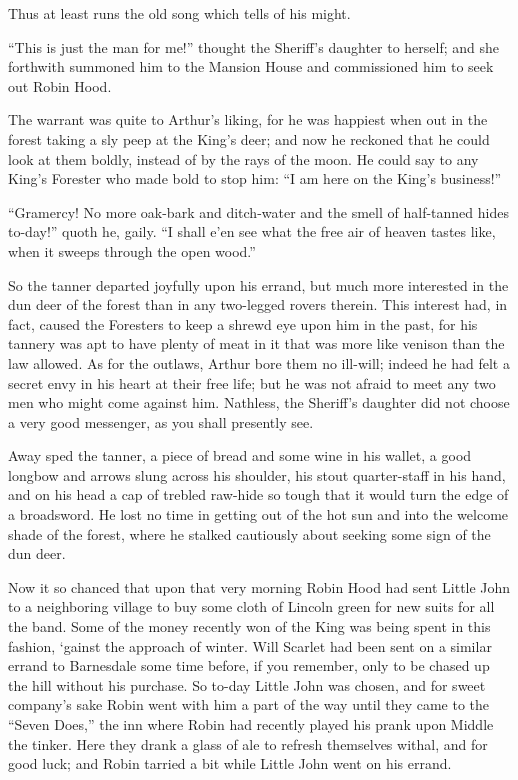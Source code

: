 Thus at least runs the old song which tells of his might.

``This is just the man for me!'' thought the Sheriff's daughter to
herself; and she forthwith summoned him to the Mansion House and
commissioned him to seek out Robin Hood.

The warrant was quite to Arthur's liking, for he was happiest when out
in the forest taking a sly peep at the King's deer; and now he reckoned
that he could look at them boldly, instead of by the rays of the moon.
He could say to any King's Forester who made bold to stop him: ``I am
here on the King's business!''

``Gramercy! No more oak-bark and ditch-water and the smell of
half-tanned hides to-day!'' quoth he, gaily. ``I shall e'en see what the
free air of heaven tastes like, when it sweeps through the open wood.''

So the tanner departed joyfully upon his errand, but much more
interested in the dun deer of the forest than in any two-legged rovers
therein. This interest had, in fact, caused the Foresters to keep a
shrewd eye upon him in the past, for his tannery was apt to have plenty
of meat in it that was more like venison than the law allowed. As for
the outlaws, Arthur bore them no ill-will; indeed he had felt a secret
envy in his heart at their free life; but he was not afraid to meet any
two men who might come against him. Nathless, the Sheriff's daughter did
not choose a very good messenger, as you shall presently see.

Away sped the tanner, a piece of bread and some wine in his wallet, a
good longbow and arrows slung across his shoulder, his stout
quarter-staff in his hand, and on his head a cap of trebled raw-hide so
tough that it would turn the edge of a broadsword. He lost no time in
getting out of the hot sun and into the welcome shade of the forest,
where he stalked cautiously about seeking some sign of the dun deer.

Now it so chanced that upon that very morning Robin Hood had sent Little
John to a neighboring village to buy some cloth of Lincoln green for new
suits for all the band. Some of the money recently won of the King was
being spent in this fashion, `gainst the approach of winter. Will
Scarlet had been sent on a similar errand to Barnesdale some time
before, if you remember, only to be chased up the hill without his
purchase. So to-day Little John was chosen, and for sweet company's sake
Robin went with him a part of the way until they came to the ``Seven
Does,'' the inn where Robin had recently played his prank upon Middle
the tinker. Here they drank a glass of ale to refresh themselves withal,
and for good luck; and Robin tarried a bit while Little John went on his
errand.

